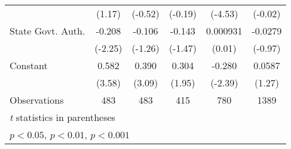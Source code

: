 \begin{table}[htbp]
\begin{tabular}{l*{5}{c}}
                                        &   (1.17)         &  (-0.52)         &  (-0.19)         &  (-4.53)         &  (-0.02)         \\
\addlinespace
State Govt. Auth.                       &   -0.208\sym{*}  &   -0.106         &   -0.143         & 0.000931         &  -0.0279         \\
                                        &  (-2.25)         &  (-1.26)         &  (-1.47)         &   (0.01)         &  (-0.97)         \\
\addlinespace
Constant                                &    0.582\sym{***}&    0.390\sym{**} &    0.304         &   -0.280\sym{*}  &   0.0587         \\
                                        &   (3.58)         &   (3.09)         &   (1.95)         &  (-2.39)         &   (1.27)         \\
\midrule
Observations                            &      483         &      483         &      415         &      780         &     1389         \\
\bottomrule
\multicolumn{6}{l}{\footnotesize \textit{t} statistics in parentheses}\\
\multicolumn{6}{l}{\footnotesize \sym{*} \(p<0.05\), \sym{**} \(p<0.01\), \sym{***} \(p<0.001\)}\\
\end{tabular}
\end{table}
